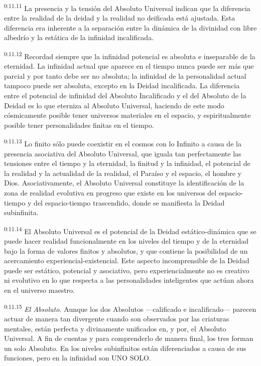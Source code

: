 \par
\textsuperscript{0:11.11} La presencia y la tensión del Absoluto Universal indican que la diferencia entre la realidad de la deidad y la realidad no deificada está ajustada. Esta diferencia era inherente a la separación entre la dinámica de la divinidad con libre albedrío y la estática de la infinidad incalificada.

\par
\textsuperscript{0:11.12} Recordad siempre que la infinidad potencial es absoluta e inseparable de la eternidad. La infinidad actual que aparece en el tiempo nunca puede ser más que parcial y por tanto debe ser no absoluta; la infinidad de la personalidad actual tampoco puede ser absoluta, excepto en la Deidad incalificada. La diferencia entre el potencial de infinidad del Absoluto Incalificado y el del Absoluto de la Deidad es lo que eterniza al Absoluto Universal, haciendo de este modo cósmicamente posible tener universos materiales en el espacio, y espiritualmente posible tener personalidades finitas en el tiempo.

\par
\textsuperscript{0:11.13} Lo finito sólo puede coexistir en el cosmos con lo Infinito a causa de la presencia asociativa del Absoluto Universal, que iguala tan perfectamente las tensiones entre el tiempo y la eternidad, la finitud y la infinidad, el potencial de la realidad y la actualidad de la realidad, el Paraíso y el espacio, el hombre y Dios. Asociativamente, el Absoluto Universal constituye la identificación de la zona de realidad evolutiva en progreso que existe en los universos del espacio-tiempo y del espacio-tiempo trascendido, donde se manifiesta la Deidad subinfinita.

\par
\textsuperscript{0:11.14} El Absoluto Universal es el potencial de la Deidad estático-dinámica que se puede hacer realidad funcionalmente en los niveles del tiempo y de la eternidad bajo la forma de valores finitos y absolutos, y que contiene la posibilidad de un acercamiento experiencial-existencial. Este aspecto incomprensible de la Deidad puede ser estático, potencial y asociativo, pero experiencialmente no es creativo ni evolutivo en lo que respecta a las personalidades inteligentes que actúan ahora en el universo maestro.

\par
\textsuperscript{0:11.15} \textit{El Absoluto.} Aunque los dos Absolutos ---calificado e incalificado--- parecen actuar de manera tan divergente cuando son observados por las criaturas mentales, están perfecta y divinamente unificados en, y por, el Absoluto Universal. A fin de cuentas y para comprenderlo de manera final, los tres forman un solo Absoluto. En los niveles subinfinitos están diferenciados a causa de sus funciones, pero en la infinidad son UNO SOLO.

